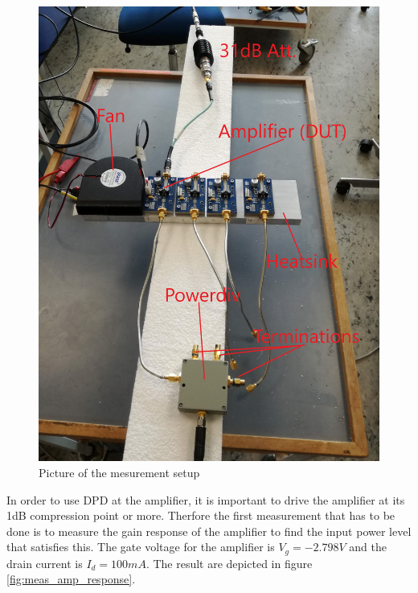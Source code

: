 \begin{figure}[H]
\centering 
\includegraphics[scale = 0.1]{figures/measurement/cree/meas1/meas_set_1.jpg}
\caption{Picture of the mesurement setup }
\label{fig:meas_amp_pic}
\end{figure}
 

In order to use DPD at the amplifier, it is important to drive the amplifier at its 1dB compression point or more. Therfore the first measurement that has to be done is to measure the gain response of the amplifier to find the input power level that satisfies this. The gate voltage for the amplifier is $V_g = -2.798V$ and the drain current is $I_d = 100mA$. The result are depicted in figure \ref{fig:meas_amp_response}.   

